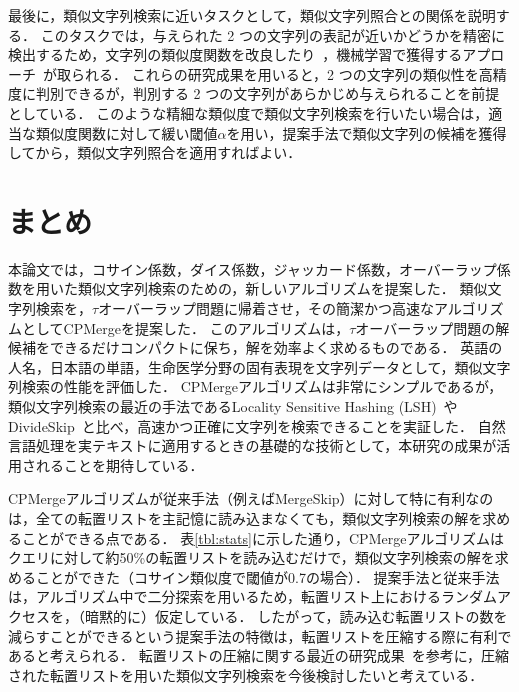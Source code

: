 \documentclass[japanese]{jnlp_JS2.0}
\begin{document}
最後に，類似文字列検索に近いタスクとして，類似文字列照合との関係を説明する．
このタスクでは，与えられた 2 つの文字列の表記が近いかどうかを精密に検出するため，文字列の類似度関数を改良したり~\cite{Winkler:99,Cohen:03}，機械学習で獲得するアプローチ~\cite{Bergsma:07,Davis:07,Tsuruoka:07,Aramaki:08}が取られる．
これらの研究成果を用いると，2 つの文字列の類似性を高精度に判別できるが，判別する 2 つの文字列があらかじめ与えられることを前提としている．
このような精細な類似度で類似文字列検索を行いたい場合は，適当な類似度関数に対して緩い閾値$\alpha$を用い，提案手法で類似文字列の候補を獲得してから，類似文字列照合を適用すればよい．



\section{まとめ}
\label{sec:conclusion}

本論文では，コサイン係数，ダイス係数，ジャッカード係数，オーバーラップ係数を用いた類似文字列検索のための，新しいアルゴリズムを提案した．
類似文字列検索を，$\tau$オーバーラップ問題に帰着させ，その簡潔かつ高速なアルゴリズムとしてCPMergeを提案した．
このアルゴリズムは，$\tau$オーバーラップ問題の解候補をできるだけコンパクトに保ち，解を効率よく求めるものである．
英語の人名，日本語の単語，生命医学分野の固有表現を文字列データとして，類似文字列検索の性能を評価した．
CPMergeアルゴリズムは非常にシンプルであるが，類似文字列検索の最近の手法であるLocality Sensitive Hashing (LSH)~\cite{Andoni:08}やDivideSkip~\cite{Li:08}と比べ，高速かつ正確に文字列を検索できることを実証した．
自然言語処理を実テキストに適用するときの基礎的な技術として，本研究の成果が活用されることを期待している．

CPMergeアルゴリズムが従来手法（例えばMergeSkip）に対して特に有利なのは，全ての転置リストを主記憶に読み込まなくても，類似文字列検索の解を求めることができる点である．
表\ref{tbl:stats}に示した通り，CPMergeアルゴリズムはクエリに対して約50\%の転置リストを読み込むだけで，類似文字列検索の解を求めることができた（コサイン類似度で閾値が0.7の場合）．
提案手法と従来手法は，アルゴリズム中で二分探索を用いるため，転置リスト上におけるランダムアクセスを，（暗黙的に）仮定している．
したがって，読み込む転置リストの数を減らすことができるという提案手法の特徴は，転置リストを圧縮する際に有利であると考えられる．
転置リストの圧縮に関する最近の研究成果~\cite{Behm:09,Yan:09}を参考に，圧縮された転置リストを用いた類似文字列検索を今後検討したいと考えている．



\acknowledgment
\end{document}
